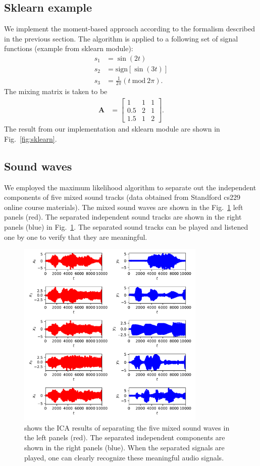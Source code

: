 \documentclass[aps,prl,preprint,superscriptaddress]{revtex4-2}
\begin{document}
\subsection{Sklearn example}
We implement the moment-based approach according to the formalism described in the previous section.
The algorithm is applied to a following set of signal functions (example from sklearn module):
\begin{align}
s_1 &= \sin(2 t) \\
s_2 &= \mathrm{sign} [\sin(3 t)] \\
s_3 &= \frac{1}{2\pi} (t~\mathrm{mod}~2\pi).
\end{align}
The mixing matrix is taken to be
\begin{align}
\mathbf{A} &= \begin{bmatrix}
1 & 1 & 1 \\
0.5 & 2 & 1 \\
1.5 & 1 & 2
\end{bmatrix}.
\end{align}
The result from our implementation and sklearn module are shown in Fig.~\ref{fig:sklearn}.
\subsection{Sound waves}
We employed the maximum likelihood algorithm to separate out the independent components of five mixed sound tracks (data obtained from Standford cs229 online course materials). The mixed sound waves are shown in the  Fig.~\ref{fig:sound} left panels (red). The separated independent sound tracks are shown in the right panels (blue) in Fig.~\ref{fig:sound}. The separated sound tracks can be played and listened one by one to verify that they are meaningful. 
\begin{figure}[b]
\includegraphics[width=0.8\textwidth]{scripts/sound_example.pdf}
 \caption{\label{fig:sound} shows the ICA results of separating the five mixed sound waves in the left panels (red). The separated independent components are shown in the right panels (blue). When the separated signals are played, one can clearly recognize these meaningful audio signals.}
\end{figure}
\end{document}
